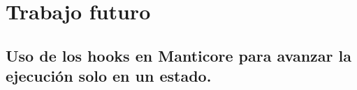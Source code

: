 \section{Trabajo futuro}

\subsection{Uso de los hooks en Manticore para avanzar la ejecución solo en un estado.}